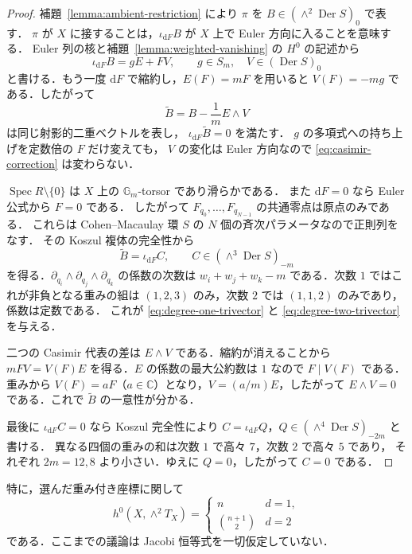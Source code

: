 \begin{proof}
補題~\ref{lemma:ambient-restriction} により $\pi$ を
$B\in(\wedge^2\operatorname{Der}S)_0$ で表す．
$\pi$ が $X$ に接することは，$\iota_{\mathrm dF}B$ が $X$ 上で Euler 方向に入ることを意味する．
Euler 列の核と補題~\ref{lemma:weighted-vanishing} の $H^0$ の記述から
\[
 \iota_{\mathrm dF}B=gE+FV,
 \qquad g\in S_m,\quad V\in(\operatorname{Der}S)_0
\]
と書ける．もう一度 $\mathrm dF$ で縮約し，$E(F)=mF$ を用いると
$V(F)=-mg$ である．したがって
\begin{equation}
 \widetilde B=B-\frac1mE\wedge V
 \label{eq:casimir-correction}
\end{equation}
は同じ射影的二重ベクトルを表し，
$\iota_{\mathrm dF}\widetilde B=0$ を満たす．
$g$ の多項式への持ち上げを定数倍の $F$ だけ変えても，
$V$ の変化は Euler 方向なので \eqref{eq:casimir-correction} は変わらない．

$\operatorname{Spec}R\setminus\{0\}$ は $X$ 上の $\mathbb G_m$-torsor であり滑らかである．
また $\mathrm dF=0$ なら Euler 公式から $F=0$ である．
したがって $F_{q_0},\ldots,F_{q_{N-1}}$ の共通零点は原点のみである．
これらは Cohen--Macaulay 環 $S$ の $N$ 個の斉次パラメータなので正則列をなす．
その Koszul 複体の完全性から
\[
 \widetilde B=\iota_{\mathrm dF}C,
 \qquad C\in(\wedge^3\operatorname{Der}S)_{-m}
\]
を得る．$\partial_{q_i}\wedge\partial_{q_j}\wedge\partial_{q_k}$ の係数の次数は
$w_i+w_j+w_k-m$ である．次数 $1$ ではこれが非負となる重みの組は
$(1,2,3)$ のみ，次数 $2$ では $(1,1,2)$ のみであり，係数は定数である．
これが \eqref{eq:degree-one-trivector} と \eqref{eq:degree-two-trivector} を与える．

二つの Casimir 代表の差は $E\wedge V$ である．縮約が消えることから
$mFV=V(F)E$ を得る．$E$ の係数の最大公約数は $1$ なので $F\mid V(F)$ である．
重みから $V(F)=aF$（$a\in\mathbb C$）となり，$V=(a/m)E$，したがって
$E\wedge V=0$ である．これで $\widetilde B$ の一意性が分かる．

最後に $\iota_{\mathrm dF}C=0$ なら Koszul 完全性により
$C=\iota_{\mathrm dF}Q$，$Q\in(\wedge^4\operatorname{Der}S)_{-2m}$ と書ける．
異なる四個の重みの和は次数 $1$ で高々 $7$，次数 $2$ で高々 $5$ であり，
それぞれ $2m=12,8$ より小さい．ゆえに $Q=0$，したがって $C=0$ である．
\end{proof}

特に，選んだ重み付き座標に関して
\[
 h^0(X,\wedge^2T_X)=
 \begin{cases}
 n&d=1,\\
 \binom{n+1}{2}&d=2
 \end{cases}
\]
である．ここまでの議論は Jacobi 恒等式を一切仮定していない．

